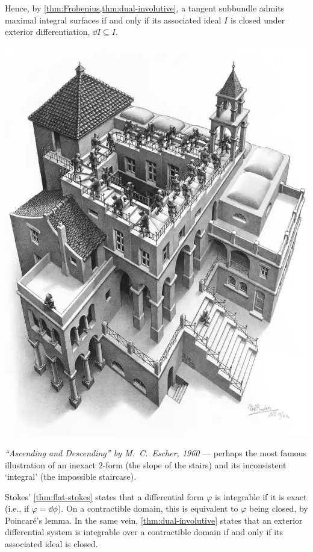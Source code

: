 Hence, by \cref{thm:Frobenius,thm:dual-involutive}, a tangent subbundle admits maximal integral surfaces if and only if its associated ideal $I$ is closed under exterior differentiation, $\dd I ⊆ I$.

\begin{marginfigure}
	\includegraphics[width=1.05\columnwidth]{figures/penrose-stairs.png}
	\caption{
		\emph{``Ascending and Descending'' by M.\ C.\ Escher, 1960} --- perhaps the most famous illustration of an inexact $2$-form (the slope of the stairs) and its inconsistent `integral' (the impossible staircase).
	}
\end{marginfigure}

Stokes’ \cref{thm:flat-stokes} states that a differential form $φ$ is integrable if it is exact (i.e., if $φ = \dd ϕ$).
On a contractible domain, this is equivalent to $φ$ being closed, by Poincaré's lemma.
In the same vein, \cref{thm:dual-involutive} states that an exterior differential system is integrable over a contractible domain if and only if its associated ideal is closed.




